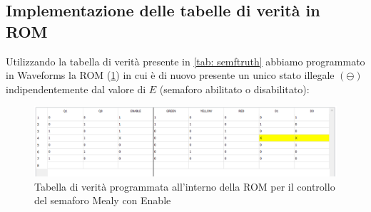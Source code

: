 \documentclass[10pt, a4paper, italian]{article}
\begin{document}
\subsection{Implementazione delle tabelle di verità in ROM}
Utilizzando la tabella di verità presente in \cref{tab: semftruth} abbiamo
programmato in Waveforms la ROM (\cref{fig: rom}) in cui è di nuovo presente
un unico stato illegale $(\ominus)$ indipendentemente dal valore di $E$
(semaforo abilitato o disabilitato):
\begin{figure}[htbp]
    \centering
    \includegraphics[width=\textwidth]{ROM.1}
    \caption{Tabella di verità programmata all'interno della ROM per il controllo del semaforo Mealy con Enable
    \label{fig: rom}}
\end{figure}
\end{document}
